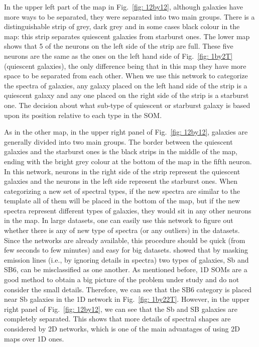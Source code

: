     
        In the upper left part of the map in Fig.~\ref{fig: 12by12}, although galaxies have more ways to be separated, they were separated into two main groups.
        There is a distinguishable strip of grey, dark grey and in some cases black colour in the map:
        this strip separates quiescent galaxies from starburst ones.
        The lower map shows that 5 of the neurons on the left side of the strip are full. 
        These five neurons are the same as the ones on the left hand side of Fig.~\ref{fig: 1by2T} (quiescent galaxies),
        the only difference being that in this map they have more space to be separated from each other.
        When we use this network to categorize the spectra of galaxies, any galaxy placed on the left hand side of the strip is a quiescent galaxy and any one placed on the right side of the strip is a starburst one.
        The decision about what sub-type of quiescent or starburst galaxy is based upon its position relative to each type in the SOM.
    
        As in the other map, in the upper right panel of Fig.~\ref{fig: 12by12}, galaxies are generally divided into two main groups.
        The border between the quiescent galaxies and the starburst ones is the black strips in the middle of the map, ending with the bright grey colour at the bottom of the map in the fifth neuron.
        In this network, neurons in the right side of the strip represent the quiescent galaxies and the neurons in the left side represent the starburst ones. 
        When categorizing a new set of spectral types, if the new spectra are similar to the \citet{Kinney96} template all of them will be placed in the bottom of the map, but if the new spectra represent different types of galaxies, they would sit in any other neurons in the map.
        In large datasets, one can easily use this network to figure out whether there is any of new type of spectra (or any outliers) in the datasets. 
        Since the networks are already available, this procedure should be quick (from few seconds to few minutes) and easy for big datasets.
         showed that by masking emission lines (i.e., by ignoring details in spectra) two types of galaxies, Sb and SB6, can be misclassified as one another.
        As mentioned before, 1D SOMs are a good method to obtain a big picture of the problem under study and do not consider the small details. 
        Therefore, we can see that the SB6 category is placed near Sb galaxies in the 1D network in Fig.~\ref{fig: 1by22T}.
        However, in the upper right panel of Fig.~\ref{fig: 12by12}, we can see that the Sb and SB galaxies are completely separated. This shows that more details of spectral shapes are considered by 2D networks, which is one of the main advantages of  using 2D maps over 1D ones.
    
